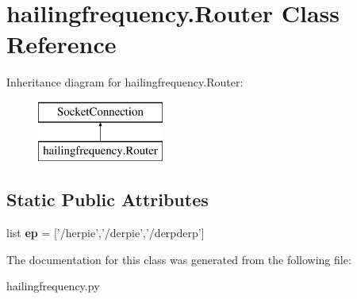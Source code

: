 \hypertarget{classhailingfrequency_1_1_router}{\section{hailingfrequency.\-Router Class Reference}
\label{classhailingfrequency_1_1_router}
}
Inheritance diagram for hailingfrequency.\-Router\-:\begin{figure}[H]
\begin{center}
\leavevmode
\includegraphics[height=2.000000cm]{classhailingfrequency_1_1_router}
\end{center}
\end{figure}
\subsection*{Static Public Attributes}
\begin{DoxyCompactItemize}
\item 
\hypertarget{classhailingfrequency_1_1_router_abd092ba4b038043ee08bc33112758c7a}{list {\bfseries ep} = \mbox{[}'/herpie','/derpie','/derpderp'\mbox{]}}\label{classhailingfrequency_1_1_router_abd092ba4b038043ee08bc33112758c7a}

\end{DoxyCompactItemize}


The documentation for this class was generated from the following file\-:\begin{DoxyCompactItemize}
\item 
hailingfrequency.\-py\end{DoxyCompactItemize}
